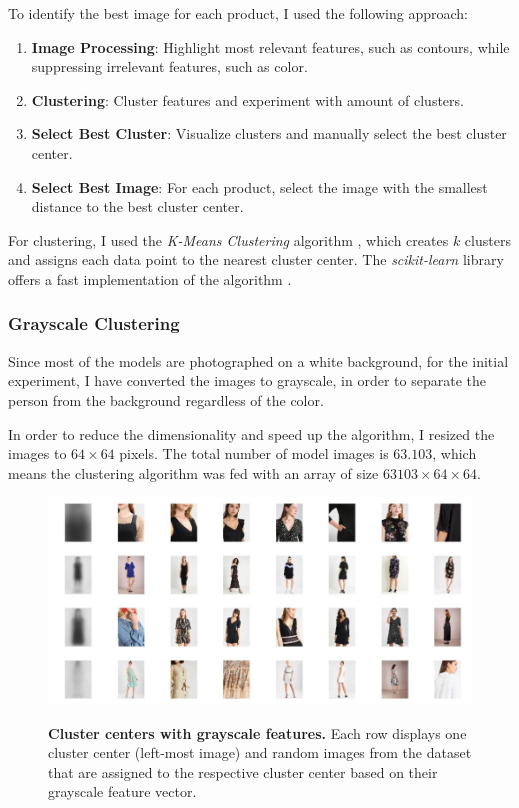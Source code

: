 \documentclass[12pt]{report}
\begin{document}
To identify the best image for each product, I used the following approach:
\begin{enumerate}
	\item \textbf{Image Processing}: Highlight most relevant features, such as contours, while suppressing irrelevant features, such as color.
	\item \textbf{Clustering}: Cluster features and experiment with amount of clusters.
	\item \textbf{Select Best Cluster}: Visualize clusters and manually select the best cluster center.
	\item \textbf{Select Best Image}: For each product, select the image with the smallest distance to the best cluster center.
\end{enumerate}


For clustering, I used the \textit{K-Means Clustering} algorithm \cite{noauthor_k-means_2018}, which creates $k$ clusters and assigns each data point to the nearest cluster center. The \textit{scikit-learn} library offers a fast implementation of the algorithm \cite{noauthor_sklearn.cluster.kmeans_nodate}.

\subsubsection{Grayscale Clustering}
Since most of the models are photographed on a white background, for the initial experiment, I have converted the images to grayscale, in order to separate the person from the background regardless of the color.

In order to reduce the dimensionality and speed up the algorithm, I resized the images to $64\times64$ pixels. The total number of model images is $63.103$, which means the clustering algorithm was fed with an array of size $63103\times64\times64$.

\begin{figure}[h]
\centering
{\includegraphics[width=\linewidth]{04_experiments/clustering/grayscale}}
\caption{\label{fig:cluster_gray} \textbf{Cluster centers with grayscale features.} Each row displays one cluster center (left-most image) and random images from the dataset that are assigned to the respective cluster center based on their grayscale feature vector.}
\end{figure}
\end{document}
